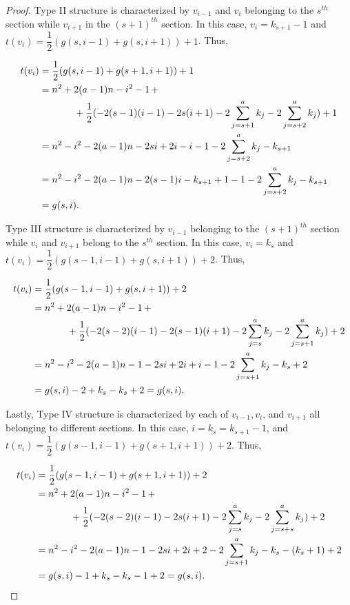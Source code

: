 \documentclass{article}
\theoremstyle{definition}
\begin{document}
\begin{proof}
\noindent Type II structure is characterized by $v_{i-1}$ and $v_i$ belonging to the $s^{th}$ section while $v_{i+1}$ in the $(s+1)^{th}$ section. In this case, $v_i = k_{s+1} - 1$ and $t(v_i) = \dfrac{1}{2}(g(s,i-1) + g(s,i+1)) + 1$. Thus,

\begin{align*}
    t(v_i) & = \dfrac{1}{2}(g(s,i-1) + g(s+1,i+1)) + 1 \\
          & = n^2 + 2(a-1)n - i^2 -1 \, +  \\
            & \hspace{.5in} + \dfrac{1}{2}(-2(s-1)(i - 1) - 2s(i+1) - 2\displaystyle \sum_{j = s+1}^a k_j - 2\displaystyle \sum_{j = s+2}^a k_j) + 1 \\
            & = n^2 - i^2 - 2(a-1)n - 2si + 2i - i - 1- 2\displaystyle \sum_{j = s+2}^a k_j - k_{s+1} \\
            & = n^2 - i^2 - 2(a-1)n - 2(s-1)i - k_{s+1} + 1 -1 -  2\displaystyle \sum_{j = s+2}^a k_j - k_{s+1} \\
            & = g(s,i).
\end{align*}

\noindent Type III structure is characterized by $v_{i-1}$ belonging to the $(s+1)^{th}$ section while $v_i$ and $v_{i+1}$ belong to the $s^{th}$ section. In this case, $v_i = k_{s}$ and $t(v_i) = \dfrac{1}{2}(g(s-1,i-1) + g(s,i+1)) + 2$. Thus,

\begin{align*}
    t(v_i) & = \dfrac{1}{2}(g(s-1,i-1) + g(s,i+1)) + 2 \\
          & = n^2 + 2(a-1)n - i^2 -1 \, +  \\
            & \hspace{.5in} + \dfrac{1}{2}(-2(s-2)(i - 1) - 2(s-1)(i+1) - 2\displaystyle \sum_{j = s}^a k_j - 2\displaystyle \sum_{j = s+1}^a k_j) + 2 \\
            & = n^2 - i^2 - 2(a-1)n - 1 - 2si + 2i + i - 1- 2\displaystyle \sum_{j = s+1}^a k_j - k_{s} + 2 \\
            & = g(s,i) -2 + k_s - k_s + 2 = g(s,i).
\end{align*}

\noindent Lastly, Type IV structure is characterized by each of $v_{i-1}, v_i$, and $v_{i+1}$ all belonging to different sections. In this case, $i = k_s = k_{s+1} -1$, and $t(v_i) = \dfrac{1}{2}(g(s-1,i-1) + g(s+1,i+1)) + 2$. Thus,

\begin{align*}
    t(v_i) & = \dfrac{1}{2}(g(s-1,i-1) + g(s+1,i+1)) + 2 \\
          & = n^2 + 2(a-1)n - i^2 -1 \, +  \\
            & \hspace{.5in} + \dfrac{1}{2}(-2(s-2)(i - 1) - 2s(i+1) - 2\displaystyle \sum_{j = s}^a k_j - 2\displaystyle \sum_{j = s+s}^a k_j) + 2 \\
            & = n^2 - i^2 - 2(a-1)n - 1 - 2si + 2i + 2 - 2\displaystyle \sum_{j = s+1}^a k_j - k_{s} - (k_{s} + 1) + 2 \\
            & = g(s,i) - 1 + k_s - k_s -1 + 2 = g(s,i).
\end{align*}


\end{proof}
\end{document}
